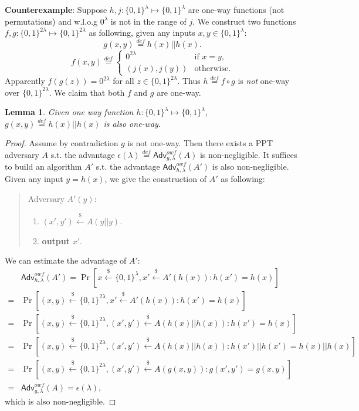 \documentclass[12pt]{article}
\newcommand{\eqdef}{\stackrel{def}{=}}
\newcommand{\bits}{\{0,1\}}
\newcommand{\getsr}{\stackrel{\$}{\gets}}
\newcommand{\Adv}{\textsf{Adv}}
\newtheorem{lemma}[theorem]{Lemma}
\theoremstyle{definition}
\begin{document}
{\bf Counterexample}: Suppose $h, j : \bits^\lambda \mapsto \bits^\lambda$ are one-way functions (not permutations) and w.l.o.g $0^\lambda$ is not in the range of $j$. We construct two functions $f,g : \bits^{2\lambda} \mapsto \bits^{2\lambda}$ as following, given any inputs $x, y \in \bits^\lambda$:
$$g(x,y) \eqdef h(x) || h(x).$$
$$f(x,y) \eqdef
\begin{cases}
0^{2\lambda} & \textrm{if $x=y$,} \\
(j(x),j(y)) & \textrm{otherwise.}
\end{cases}$$
Apparently $f(g(z)) = 0^{2\lambda}$ for all $z\in\bits^{2\lambda}$. Thus $h\eqdef f\circ g$ is \emph{not} one-way over $\bits^{2\lambda}$.
We claim that both $f$ and $g$ are one-way.
\begin{lemma}
Given one way function $h : \bits^\lambda \mapsto \bits^\lambda$, $g(x,y) \eqdef h(x) || h(x)$ is also one-way.
\end{lemma}
\begin{proof}
Assume by contradiction $g$ is not one-way. Then there exists a PPT adversary $A$ s.t. the advantage $\epsilon(\lambda) \eqdef \Adv_{g,\lambda}^{owf}(A)$ is non-negligible. It suffices to build an algorithm $A'$ s.t. the advantage $\Adv_{h,\lambda}^{owf}(A')$ is also non-negligible. Given any input $y=h(x)$, we give the construction of $A'$ as following:
\begin{quote}
Adversary $A' (y)$:
\begin{enumerate}
\item $(x', y') \getsr A(y || y)$.
\item {\bf output} $x'$.
\end{enumerate}
\end{quote}
We can estimate the advantage of $A'$:
$$
\begin{aligned}
&\Adv_{h,\lambda}^{owf}(A') = \Pr[x\getsr \bits^\lambda, x' \getsr A'(h(x)) : h(x')=h(x)] \\
=& \Pr[(x,y)\getsr \bits^{2\lambda}, x' \getsr A'(h(x)) : h(x')=h(x)] \\
=& \Pr[(x,y)\getsr \bits^{2\lambda}, (x', y') \getsr A(h(x) || h(x)) : h(x')=h(x)] \\
=& \Pr[(x,y)\getsr \bits^{2\lambda}, (x', y') \getsr A(h(x) || h(x)) : h(x')||h(x') = h(x)||h(x)] \\
=& \Pr[(x,y)\getsr \bits^{2\lambda}, (x', y') \getsr A(g(x, y)) : g(x', y') = g(x, y)] \\
=& \Adv_{g,\lambda}^{owf}(A) = \epsilon(\lambda),
\end{aligned}
$$
which is also non-negligible.
\end{proof}
\end{document}
